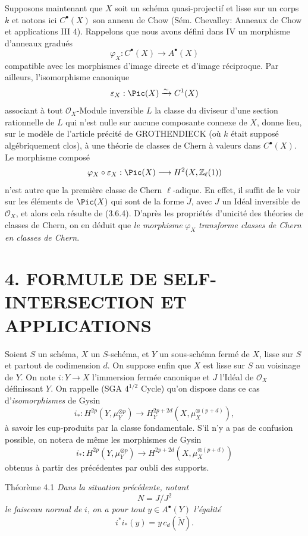 Supposons maintenant que $X$ soit un schéma quasi-projectif et lisse sur un corps $k$ et notons ici $C^{\bullet}(X)$ son anneau de Chow (Sém. Chevalley: Anneaux de Chow et applications III 4). Rappelons que nous avons défini dans IV un morphisme d'anneaux gradués
\[
\varphi_X:C^{\bullet}(X)\to A^{\bullet}(X)
\]
compatible avec les morphismes d'image directe et d'image réciproque. Par ailleurs, l'isomorphisme canonique
\[
\varepsilon_X:\Pic(X)\xrightarrow{\sim} C^1(X)
\]
associant à tout $\mathcal{O}_X$-Module inversible $L$ la classe du diviseur d'une section rationnelle de $L$ qui n'est nulle sur aucune composante connexe de $X$, donne lieu, sur le modèle de l'article précité de GROTHENDIECK (où $k$ était supposé algébriquement clos), à une théorie de classes de Chern à valeurs dans $C^{\bullet}(X)$. Le morphisme composé
\[
\varphi_X\circ\varepsilon_X:\Pic(X)\longrightarrow H^2(X,\mathbb{Z}_\ell(1))
\]
n'est autre que la première classe de Chern $\ell$-adique. En effet, il suffit de le voir sur les éléments de $\Pic(X)$ qui sont de la forme $\check J$, avec $J$ un Idéal inversible de $\mathcal{O}_X$, et alors cela résulte de (3.6.4). D'après les propriétés d'unicité des théories de classes de Chern, on en déduit que \emph{le morphisme} $\varphi_X$ \emph{transforme classes de Chern en classes de Chern}.

\section*{4. FORMULE DE SELF-INTERSECTION ET APPLICATIONS}

Soient $S$ un schéma, $X$ un $S$-schéma, et $Y$ un sous-schéma fermé de $X$, lisse sur $S$ et partout de codimension $d$. On suppose enfin que $X$ est lisse sur $S$ au voisinage de $Y$. On note $i:Y\to X$ l'immersion fermée canonique et $J$ l'Idéal de $\mathcal{O}_X$ définissant $Y$. On rappelle (SGA $4^{1/2}$ Cycle) qu'on dispose dans ce cas d'\emph{isomorphismes} de Gysin
\[
i_*:H^{2p}(Y,\mu_Y^{\otimes p})
\to H_Y^{2p+2d}(X,\mu_X^{\otimes(p+d)}),
\]
à savoir les cup-produits par la classe fondamentale. S'il n'y a pas de confusion possible, on notera de même les morphismes de Gysin
\[
i_*:H^{2p}(Y,\mu_Y^{\otimes p})
\to H^{2p+2d}(X,\mu_X^{\otimes(p+d)})
\]
obtenus à partir des précédentes par oubli des supports.

\begin{statement}{Théorème 4.1}
\emph{Dans la situation précédente, notant}
\[
N=J/J^2
\]
\emph{le faisceau normal de} $i$, \emph{on a pour tout} $y\in A^{\bullet}(Y)$ \emph{l'égalité}
\[
i^*i_*(y)=y\,c_d(\check N).
\]
\end{statement}

